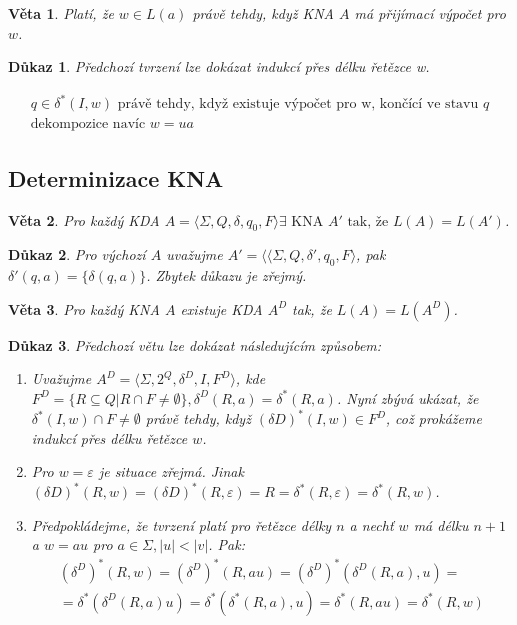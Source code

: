 \documentclass[10pt, a4paper, titlepage]{article}
\theoremstyle{note}
\newtheorem{veta}{\textbf{Věta}}
\newtheorem{dukaz}{\textbf{Důkaz}}
\begin{document}
\begin{veta}
Platí, že $w \in L(a)$ právě tehdy, když KNA $A$ má přijímací výpočet pro $w$.
\end{veta}
\begin{dukaz}
Předchozí tvrzení lze dokázat indukcí přes délku řetězce w.

\begin{gather*}
q \in \delta^{*}(I,w) \text{ právě tehdy, když existuje výpočet pro w, končící ve stavu } q \\
\text{dekompozice navíc } w = ua
\end{gather*}
\end{dukaz}

\subsection{Determinizace KNA}
\begin{veta}
Pro každý KDA $A=\langle \Sigma, Q, \delta, q_{0}, F \rangle \exists \text{ KNA } A' \text{ tak, že } L(A)=L(A') $.
\end{veta}
\begin{dukaz}
Pro výchozí $A$ uvažujme $A'=\langle \langle \Sigma, Q, \delta', q_{0}, F \rangle$, pak $\delta'(q,a) = \lbrace \delta(q,a) \rbrace$. Zbytek důkazu je zřejmý.
\end{dukaz}

\begin{veta}
Pro každý KNA $A$ existuje KDA $A^{D}$ tak, že $L(A) = L(A^{D})$.
\end{veta}
\begin{dukaz}
Předchozí větu lze dokázat následujícím způsobem:

\begin{enumerate}
\item
Uvažujme $A^{D} = \langle \Sigma, 2^{Q}, \delta^{D}, I, F^{D} \rangle$, kde $F^{D} = \lbrace R  \subseteq Q | R \cap F \neq \emptyset \rbrace, \delta^{D}(R,a) = \delta^{*}(R,a)$.
Nyní zbývá ukázat, že $\delta^{*}(I,w) \cap F \neq \emptyset$ právě tehdy, když $(\delta{D})^{*}(I,w) \in F^{D}$, což prokážeme indukcí přes délku řetězce $w$.

\item
Pro $w = \varepsilon$ je situace zřejmá. Jinak $(\delta{D})^{*} (R,w) = (\delta{D})^{*} (R, \varepsilon) = R = \delta^{*}(R, \varepsilon) = \delta^{*}(R,w)$.

\item
Předpokládejme, že tvrzení platí pro řetězce délky $n$ a nechť $w$ má délku $n+1$ a $w=au$ pro $a \in \Sigma, |u| < |v|$. Pak:
\begin{gather*}
(\delta^{D})^{*} (R,w) = (\delta^{D})^{*} (R, au) = (\delta^{D})^{*}(\delta^{D}(R,a),u) = \\
= \delta^{*}(\delta^{D}(R,a)u) = \delta^{*}(\delta^{*}(R,a),u) = \delta^{*}(R, au) = \delta^{*}(R,w)
\end{gather*}
\end{enumerate}
\end{dukaz}
\end{document}
